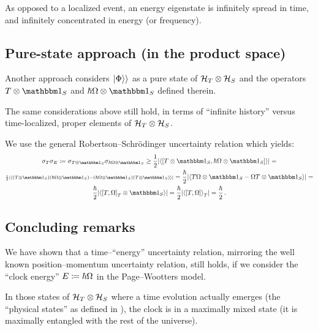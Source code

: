 As opposed to a localized event, an energy eigenstate is infinitely spread in time,
and infinitely concentrated in energy (or frequency).

\subsection{Pure-state approach (in the product space)}\label{sec:pure-state-approach}

Another approach considers $\left.\left| \Phi \right\rangle\right\rangle$ as a pure state of $\mathcal{H}_T \otimes \mathcal{H}_S$
and the operators $\op{T} \ox \idop_{S}$ and $\hbar\op{\Omega} \ox \idop_{S}$
defined therein.

The same considerations above still hold, in terms of ``infinite history'' versus
time-localized, proper elements of $\mathcal{H}_T \otimes \mathcal{H}_S$. 

We use the general Robertson--Schr\"{o}dinger uncertainty relation which yields:
\begin{multline}
  \sigma_T \sigma_E \eqbydef
  \sigma_{T \ox \idop_S} \sigma_{\hbar\Omega \ox \idop_S} \geq
  \frac{1}{2} \abs{\expval{\comm
    {\op{T}\ox\idop_S} {\hbar\op{\Omega}\ox\idop_S}
  }} =
  \\
  {\scriptstyle
    \frac{1}{2} \abs{\expval{
      \qty(\op{T}\ox\idop_S) \qty(\hbar\op{\Omega}\ox\idop_S) -
      \qty(\hbar\op{\Omega}\ox\idop_S) \qty(\op{T}\ox\idop_S)
    }}
  } =
  \frac{\hbar}{2} \abs{\expval{
    \op{T}\op{\Omega}\ox\idop_S - \op{\Omega}\op{T}\ox\idop_S
  }} = \\
  \frac{\hbar}{2} \abs{\expval{
    \comm{\op{T}}{\op{\Omega}}_T \ox \idop_S
  }} =
  \frac{\hbar}{2} \abs{\expval{\comm
    {\op{T}}{\op{\Omega}}
  }_T} =
  \frac{\hbar}{2}
  \,\text{.}
\end{multline}

\subsection{Concluding remarks}

We have shown that a time--``energy'' uncertainty relation,
mirroring the well known position--momentum uncertainty relation,
still holds, if we consider the ``clock energy'' ${E} \coloneqq \hbar{\Omega}$
in the Page--Wootters model.

In those states of $\mathcal{H}_T \otimes \mathcal{H}_S$ where a time evolution actually emerges
(the ``physical states'' as defined in \cite{Lloyd:Time}),
the clock is in a maximally mixed state
(it is maximally entangled with the rest of the universe).

